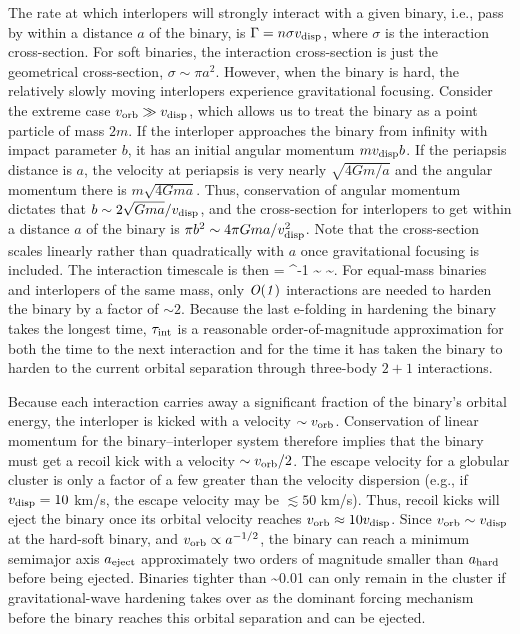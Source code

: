 \documentclass[amsmath,onecolumn]{aastex}
\begin{document}
The rate at which interlopers will strongly interact with a given binary, i.e., pass by within a distance $a$ of the binary, is $\Gamma = n \sigma v_\textrm{disp}$, where $\sigma$ is the interaction cross-section.  For soft binaries, the interaction cross-section is just the geometrical cross-section, $\sigma \sim \pi a^2$.  However, when the binary is hard, the relatively slowly moving interlopers experience gravitational focusing.    Consider the extreme case $v_\textrm{orb} \gg v_\textrm{disp}$, which allows us to treat the binary as a point particle of mass $2m$.  If the interloper approaches the binary from infinity with impact parameter $b$, it has an initial angular momentum $m v_\textrm{disp} b$.  If the periapsis distance is $a$, the velocity at periapsis is very nearly $\sqrt{4 G m / a}$ and the angular momentum there is $m \sqrt{4 G m a}$.  Thus, conservation of angular momentum dictates that $b \sim 2\sqrt{G m a}/v_\textrm{disp}$, and the cross-section for interlopers to get within a distance $a$ of the binary is $\pi b^2 \sim 4\pi G m a / v_\textrm{disp}^2$.  Note that the cross-section scales linearly rather than quadratically with $a$ once gravitational focusing is included.   The interaction timescale is then
\be
\tint = \Gamma^{-1} \sim {} \sim {}.
\ee
For equal-mass binaries and interlopers of the same mass, only $\it{O}(1)$ interactions are needed to harden the binary by a factor of $\sim 2$.  Because the last e-folding in hardening the binary takes the longest time, $\tau_\textrm{int}$ is a reasonable order-of-magnitude approximation for both the time to the next interaction and for the time it has taken the binary to harden to the current orbital separation through three-body $2+1$ interactions.  

Because each interaction carries away a significant fraction of the binary's orbital energy, the interloper is kicked with a velocity $\sim v_\textrm{orb}$.  Conservation of linear momentum for the binary--interloper system therefore implies that the binary must get a recoil kick with a velocity $\sim v_\textrm{orb}/2$.  The escape velocity for a globular cluster is only a factor of a few greater than the velocity dispersion (e.g., if $v_\textrm{disp} = 10$ km/s, the escape velocity may be $\lesssim 50$ km/s).  Thus, recoil kicks will eject the binary once its orbital velocity reaches $v_\textrm{orb} \approx 10 v_\textrm{disp}$.  Since $v_\textrm{orb} \sim v_\textrm{disp}$ at the hard-soft binary, and $v_\textrm{orb} \propto a^{-1/2}$, the binary can reach a minimum semimajor axis $a_\textrm{eject}$ approximately two orders of magnitude smaller than $a_\textrm{hard}$ before being ejected.   Binaries tighter than 
\be
\aeject \sim 0.01 \ahard
\ee
can only remain in the cluster if gravitational-wave hardening takes over as the dominant forcing mechanism before the binary reaches this orbital separation and can be ejected.
\end{document}
